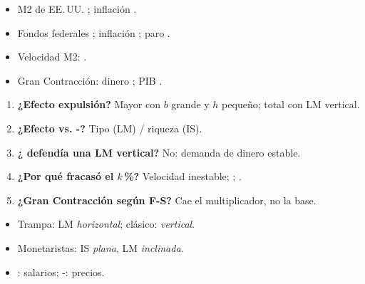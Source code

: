 \documentclass{article}
\begin{document}
\begin{columnas}
\anexorepaso
{}
\begin{itemize}
\item M2 de EE.\,UU. ; inflación .
\item Fondos federales ; inflación ; paro .
\item Velocidad M2: .
\item Gran Contracción: dinero ; PIB .
\end{itemize}
\begin{enumerate}
\item \textbf{¿Efecto expulsión?} Mayor con $b$ grande y $h$ pequeño; total con LM vertical.
\item \textbf{¿Efecto  vs. -?} Tipo (LM) / riqueza (IS).
\item \textbf{¿ defendía una LM vertical?} No: demanda de dinero estable.
\item \textbf{¿Por qué fracasó el $k$\,\%?} Velocidad inestable; ; .
\item \textbf{¿Gran Contracción según F-S?} Cae el multiplicador, no la base.
\end{enumerate}
\begin{trampa}
\begin{itemize}
\item Trampa: LM \emph{horizontal}; clásico: \emph{vertical}.
\item Monetaristas: IS \emph{plana}, LM \emph{inclinada}.
\item {}: salarios; -: precios.
\end{itemize}
\end{trampa}

\end{columnas}
\end{document}
